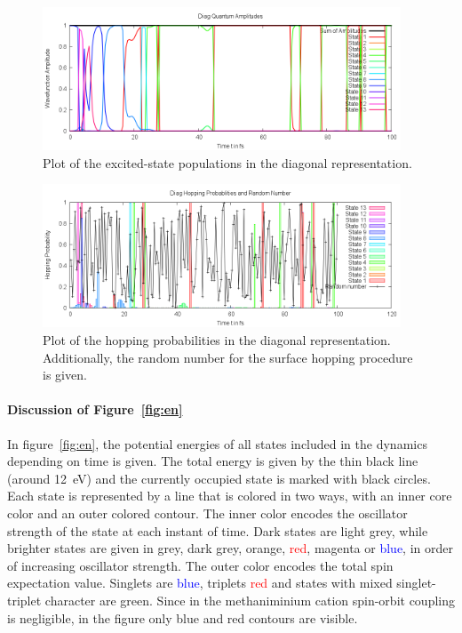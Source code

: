 \documentclass[a4paper,11pt,DIV=15,openany]{scrbook}
\begin{document}
\begin{figure}[p]
  \centering
  \includegraphics[width=0.95\textwidth]{figures/coeff_diag.png}
  \caption{Plot of the excited-state populations in the diagonal representation.}
  \label{fig:cDIAG}
\end{figure}
\begin{figure}[p]
  \centering
  \includegraphics[width=0.95\textwidth]{figures/prob.png}
  \caption{Plot of the hopping probabilities in the diagonal representation. Additionally, the random number for the surface hopping procedure is given.}
  \label{fig:prob}
\end{figure}

\paragraph{Discussion of Figure~\ref{fig:en}}

In figure~\ref{fig:en}, the potential energies of all states included in the dynamics depending on time is given. 
The total energy is given by the thin black line (around 12~eV) and the currently occupied state is marked with black circles. 
Each state is represented by a line that is colored in two ways, with an inner core color and an outer colored contour.
The inner color encodes the oscillator strength of the state at each instant of time. 
Dark states are \textcolor{black!20}{light grey}, while brighter states are given in \textcolor{black!40}{grey}, \textcolor{black!70}{dark grey}, \textcolor{red!60!green}{orange}, \textcolor{red}{red}, \textcolor{red!50!blue}{magenta} or \textcolor{blue}{blue}, in order of increasing oscillator strength. 
The outer color encodes the total spin expectation value. 
Singlets are \textcolor{blue}{blue}, triplets \textcolor{red}{red} and states with mixed singlet-triplet character are \textcolor{green!90!black}{green}. 
Since in the methaniminium cation spin-orbit coupling is negligible, in the figure only blue and red contours are visible.
\end{document}
